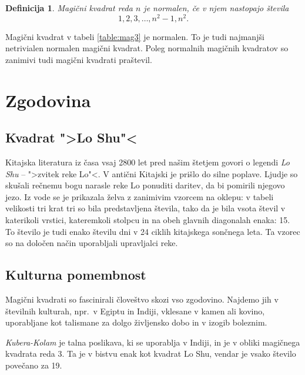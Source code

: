 \documentclass[a4paper,12pt]{article}
\newtheorem{definicija}{Definicija}
\begin{document}
\begin{definicija}
   Magični kvadrat reda \(n\) je \emph{normalen}, če v njem nastopajo števila
   \begin{equation}
      \label{eq:numbers}
      1, 2, 3, \ldots, n^2-1, n^2.
   \end{equation}
\end{definicija}

Magični kvadrat v tabeli \ref{table:mag3} je normalen.
To je tudi najmanjši netrivialen normalen magični kvadrat.
Poleg normalnih magičnih kvadratov so zanimivi tudi magični kvadrati praštevil. %


\section{Zgodovina}

\subsection{Kvadrat ">Lo Shu"<}

Kitajska literatura iz časa vsaj 2800 let pred našim štetjem govori o legendi
\emph{Lo Shu} -- ">zvitek reke Lo"<. V antični Kitajski je prišlo do
silne poplave. Ljudje so skušali rečnemu bogu narasle reke Lo ponuditi daritev,
da bi pomirili njegovo jezo. Iz vode se je prikazala želva z zanimivim vzorcem
na oklepu: v tabeli velikosti tri krat tri so bila predstavljena števila, tako
da je bila vsota števil v katerikoli vrstici, kateremkoli stolpcu in na obeh
glavnih diagonalah enaka: 15. To število je tudi enako številu dni v 24 ciklih
kitajskega sončnega leta. Ta vzorec so na določen način uporabljali upravljalci
reke.


\subsection{Kulturna pomembnost}

Magični kvadrati so fascinirali človeštvo skozi vso zgodovino. Najdemo jih
v številnih kulturah, npr.\ v Egiptu in Indiji, vklesane v kamen ali
kovino, uporabljane kot talismane za dolgo življensko dobo in v
izogib boleznim.

\emph{Kubera-Kolam} je talna poslikava, ki se uporablja v Indiji, in je v
obliki magičnega kvadrata reda 3. Ta je v bistvu enak kot kvadrat
Lo Shu, vendar je vsako število povečano za 19.
\end{document}
